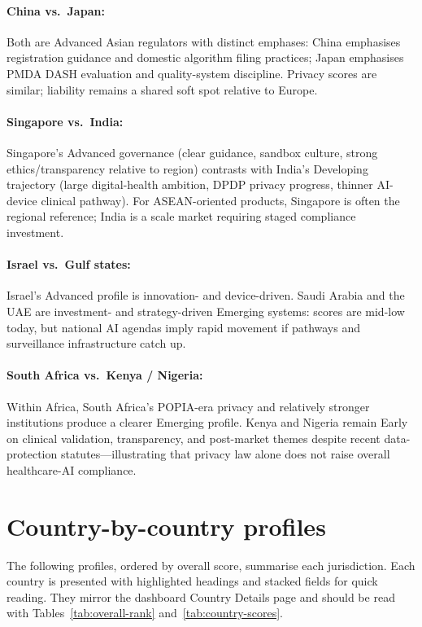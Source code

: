 \documentclass[12pt,a4paper]{report}
\begin{document}
\paragraph{China vs.\ Japan:}
Both are Advanced Asian regulators with distinct emphases: China emphasises registration guidance and domestic algorithm filing practices; Japan emphasises PMDA DASH evaluation and quality-system discipline. Privacy scores are similar; liability remains a shared soft spot relative to Europe.

\paragraph{Singapore vs.\ India:}
Singapore's Advanced governance (clear guidance, sandbox culture, strong ethics/transparency relative to region) contrasts with India's Developing trajectory (large digital-health ambition, DPDP privacy progress, thinner AI-device clinical pathway). For ASEAN-oriented products, Singapore is often the regional reference; India is a scale market requiring staged compliance investment.

\paragraph{Israel vs.\ Gulf states:}
Israel's Advanced profile is innovation- and device-driven. Saudi Arabia and the UAE are investment- and strategy-driven Emerging systems: scores are mid-low today, but national AI agendas imply rapid movement if pathways and surveillance infrastructure catch up.

\paragraph{South Africa vs.\ Kenya / Nigeria:}
Within Africa, South Africa's POPIA-era privacy and relatively stronger institutions produce a clearer Emerging profile. Kenya and Nigeria remain Early on clinical validation, transparency, and post-market themes despite recent data-protection statutes---illustrating that privacy law alone does not raise overall healthcare-AI compliance.

\section{Country-by-country profiles}

The following profiles, ordered by overall score, summarise each jurisdiction. Each country is presented with highlighted headings and stacked fields for quick reading. They mirror the dashboard Country Details page and should be read with Tables~\ref{tab:overall-rank} and~\ref{tab:country-scores}.
\end{document}
